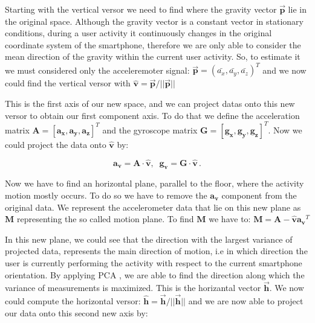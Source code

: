Starting with the vertical versor we need to find where the gravity vector $\boldsymbol{\vec{p}}$ lie in the original space. Although the gravity vector is a constant vector in stationary conditions, during a user activity it continuously changes in the original coordinate system of the smartphone, therefore we are only able to consider the mean direction of the gravity within the current user activity. So, to estimate it we must considered only the acceleremoter signal: \mbox{$ \boldsymbol{\vec{p}} = (\bar{a_{x}}, \bar{a_{y}}, \bar{a_{z}})^{T}$}  and we now could find the vertical versor with \mbox{$ \boldsymbol{\hat{v}} = \boldsymbol{\vec{p}} / ||\boldsymbol{\vec{p}}|| $}

This is the first axis of our new space, and we can project datas onto this new versor to obtain our first component axis. To do that we define the acceleration matrix \mbox{$\boldsymbol{A} = [ \boldsymbol{a_{x}}, \boldsymbol{a_{y}}, \boldsymbol{a_{z}} ]^{T}$} and the gyroscope matrix \mbox{$\boldsymbol{G} = [ \boldsymbol{g_{x}}, \boldsymbol{g_{y}}, \boldsymbol{g_{z}} ]^{T} $}. Now we could project the data onto $\boldsymbol{\hat{v}}$ by:

\begin{equation}
	\label{v-axis eq}
	 \boldsymbol{a_{v}} = \boldsymbol{A} \cdot \boldsymbol{\hat{v}} ,\;\; \boldsymbol{g_{v}} = \boldsymbol{G} \cdot \boldsymbol{\hat{v}} \,.
\end{equation}

Now we have to find an horizontal plane, parallel to the floor, where the activity motion mostly occurs. To do so we have to remove the  $\boldsymbol{a_{v}}$ component from the original data. We represent the accelerometer data that lie on this new plane as $\boldsymbol{M}$ representing the so called motion plane. To find $\boldsymbol{M}$ we have to: \mbox{$\boldsymbol{M} = \boldsymbol{A} - \boldsymbol{\hat{v}} \boldsymbol{a_{v}}^{T} $}

In this new plane, we could see that the direction with the largest variance of projected data, represents the main direction of motion, i.e in which direction the user is currently performing the activity with respect to the current smartphone orientation. By applying PCA \cite{rao1964use}, we are able to find the direction along which the variance of measurements is maximized. This is the horizantal vector $\boldsymbol{\vec{h}}$. We now could compute the horizontal versor: \mbox{$ \boldsymbol{\hat{h}} = \boldsymbol{\vec{h}} / ||\boldsymbol{\vec{h}}|| $} and we are now able to project our data onto this second new axis by:

